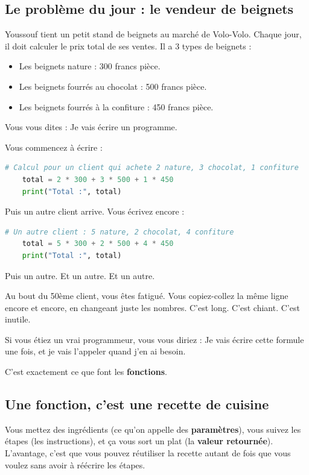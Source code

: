 \documentclass[12pt,a4paper]{article}
\begin{document}
\subsection{Le problème du jour : le vendeur de beignets}

Youssouf tient un petit stand de beignets au marché de Volo-Volo. Chaque jour, il doit calculer le prix total de ses ventes. Il a 3 types de beignets :

\begin{itemize}
	\item Les beignets nature : 300 francs pièce.
	\item Les beignets fourrés au chocolat : 500 francs pièce.
	\item Les beignets fourrés à la confiture : 450 francs pièce.
\end{itemize}

Vous vous dites : \og Je vais écrire un programme. \fg

Vous commencez à écrire :

\begin{lstlisting}[language=Python]
	# Calcul pour un client qui achete 2 nature, 3 chocolat, 1 confiture
	total = 2 * 300 + 3 * 500 + 1 * 450
	print("Total :", total)
\end{lstlisting}

Puis un autre client arrive. Vous écrivez encore :

\begin{lstlisting}[language=Python]
	# Un autre client : 5 nature, 2 chocolat, 4 confiture
	total = 5 * 300 + 2 * 500 + 4 * 450
	print("Total :", total)
\end{lstlisting}

Puis un autre. Et un autre. Et un autre.

Au bout du 50ème client, vous êtes fatigué. Vous copiez-collez la même ligne encore et encore, en changeant juste les nombres. C'est long. C'est chiant. C'est inutile.

Si vous étiez un vrai programmeur, vous vous diriez : \og Je vais écrire cette formule une fois, et je vais l'appeler quand j'en ai besoin. \fg

C'est exactement ce que font les \textbf{fonctions}.

\subsection{Une fonction, c'est une recette de cuisine}

Vous mettez des ingrédients (ce qu'on appelle des \textbf{paramètres}), vous suivez les étapes (les instructions), et ça vous sort un plat (la \textbf{valeur retournée}). L'avantage, c'est que vous pouvez réutiliser la recette autant de fois que vous voulez sans avoir à réécrire les étapes.
\end{document}
